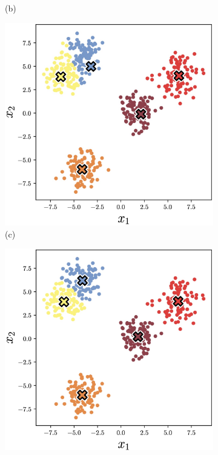 \begin{figure}[t]
{\begin{subfigure}{0.25\textwidth}
    \caption*{(b)}
  \end{subfigure}%
  \hspace*{\fill}   %
  \begin{subfigure}{0.25\textwidth}
    \includegraphics[width=\linewidth]{figures/representation_learning/kmeans_ex_step3.jpg}
    \caption*{(c)}
  \end{subfigure}%
  \hspace*{\fill}   %
  \begin{subfigure}{0.25\textwidth}
    \includegraphics[width=\linewidth]{figures/representation_learning/kmeans_ex_step4.jpg}

\end{subfigure}}
\end{figure}
